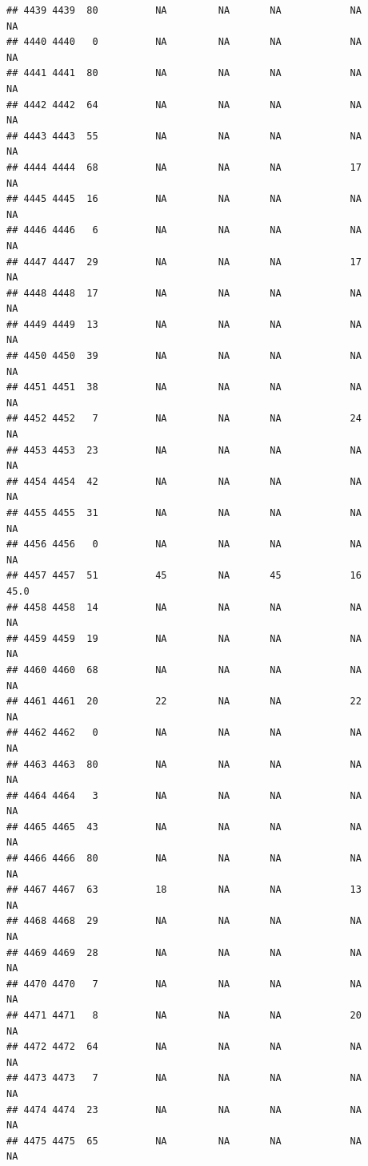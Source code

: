 \documentclass[man]{apa6}
\begin{document}
\begin{verbatim}
## 4439 4439  80          NA         NA       NA            NA       NA
## 4440 4440   0          NA         NA       NA            NA       NA
## 4441 4441  80          NA         NA       NA            NA       NA
## 4442 4442  64          NA         NA       NA            NA       NA
## 4443 4443  55          NA         NA       NA            NA       NA
## 4444 4444  68          NA         NA       NA            17       NA
## 4445 4445  16          NA         NA       NA            NA       NA
## 4446 4446   6          NA         NA       NA            NA       NA
## 4447 4447  29          NA         NA       NA            17       NA
## 4448 4448  17          NA         NA       NA            NA       NA
## 4449 4449  13          NA         NA       NA            NA       NA
## 4450 4450  39          NA         NA       NA            NA       NA
## 4451 4451  38          NA         NA       NA            NA       NA
## 4452 4452   7          NA         NA       NA            24       NA
## 4453 4453  23          NA         NA       NA            NA       NA
## 4454 4454  42          NA         NA       NA            NA       NA
## 4455 4455  31          NA         NA       NA            NA       NA
## 4456 4456   0          NA         NA       NA            NA       NA
## 4457 4457  51          45         NA       45            16     45.0
## 4458 4458  14          NA         NA       NA            NA       NA
## 4459 4459  19          NA         NA       NA            NA       NA
## 4460 4460  68          NA         NA       NA            NA       NA
## 4461 4461  20          22         NA       NA            22       NA
## 4462 4462   0          NA         NA       NA            NA       NA
## 4463 4463  80          NA         NA       NA            NA       NA
## 4464 4464   3          NA         NA       NA            NA       NA
## 4465 4465  43          NA         NA       NA            NA       NA
## 4466 4466  80          NA         NA       NA            NA       NA
## 4467 4467  63          18         NA       NA            13       NA
## 4468 4468  29          NA         NA       NA            NA       NA
## 4469 4469  28          NA         NA       NA            NA       NA
## 4470 4470   7          NA         NA       NA            NA       NA
## 4471 4471   8          NA         NA       NA            20       NA
## 4472 4472  64          NA         NA       NA            NA       NA
## 4473 4473   7          NA         NA       NA            NA       NA
## 4474 4474  23          NA         NA       NA            NA       NA
## 4475 4475  65          NA         NA       NA            NA       NA

\end{verbatim}
\end{document}

